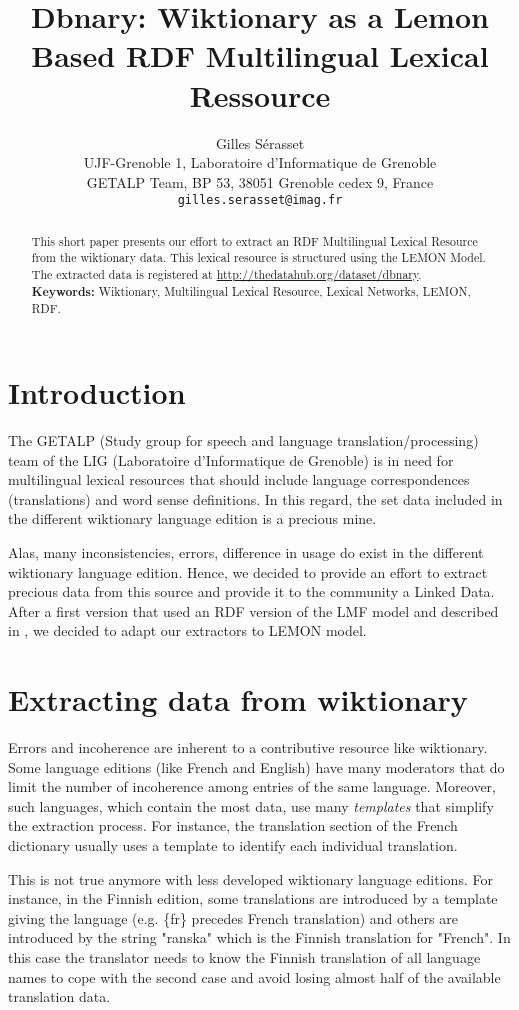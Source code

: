 \documentclass[10pt, a4paper]{article}
\title{Dbnary: Wiktionary as a Lemon Based RDF Multilingual Lexical Ressource}
\author{Gilles Sérasset\\
UJF-Grenoble 1, Laboratoire d'Informatique de Grenoble\\ 
GETALP Team, BP 53, 38051 Grenoble cedex 9, France \\ 
\texttt{gilles.serasset@imag.fr}
\\}
\date{}
\begin{document}
\maketitle

\begin{abstract}
This short paper presents our effort to extract an RDF Multilingual Lexical Resource from the wiktionary data. This lexical resource is structured using the LEMON Model.\\
The extracted data is registered at \url{http://thedatahub.org/dataset/dbnary}.
\textbf{Keywords:} Wiktionary, Multilingual Lexical Resource, Lexical Networks, LEMON, RDF.
\end{abstract}


\section{Introduction}

The GETALP (Study group for speech and language translation/processing) team of the LIG (Laboratoire d'Informatique de Grenoble) is in need for multilingual lexical resources that should include language correspondences (translations) and word sense definitions. In this regard, the set data included in the different wiktionary language edition is a precious mine.

Alas, many inconsistencies, errors, difference in usage do exist in the different wiktionary language edition. Hence, we decided to provide an effort to extract precious data from this source and provide it to the community a Linked Data. After a first version that used an RDF version of the LMF model and described in \cite{serasset:lrec2012}, we decided to adapt our extractors to LEMON model.

\section{Extracting data from wiktionary}

Errors and incoherence are inherent to a contributive resource like wiktionary. Some language editions (like French and English) have many moderators that do limit the number of incoherence among entries of the same language. Moreover, such languages, which contain the most data, use many \textit{templates} that simplify the extraction process. For instance, the translation section of the French dictionary usually uses a template to identify each individual translation.

This is not true anymore with less developed wiktionary language editions. For instance, in the Finnish edition, some translations are introduced by a template giving the language (e.g. \{fr\} precedes French translation) and others are introduced by the string "ranska" which is the Finnish translation for "French". In this case the translator needs to know the Finnish translation of all language names to cope with the second case and avoid losing almost half of the available translation data.
\end{document}
